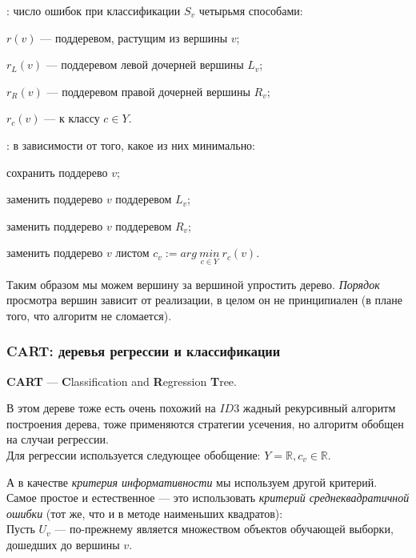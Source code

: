 \documentclass{article}
\begin{document}
\begin{itemize}
\qquad {}: \qquad число ошибок при классификации $S_v$ четырьмя способами:
		
			\qquad \qquad \qquad \qquad $r(v)$ --- поддеревом, растущим из вершины $v$;
			
			\qquad \qquad \qquad \qquad $r_L(v)$ --- поддеревом левой дочерней вершины $L_v$;
			
			\qquad \qquad \qquad \qquad $r_R(v)$ --- поддеревом правой дочерней вершины $R_v$;

			\qquad \qquad \qquad \qquad $r_c(v)$ --- к классу $c \in Y$.


\qquad {}: \qquad в зависимости от того, какое из них минимально:
		
			\qquad \qquad \qquad \qquad сохранить поддерево $v$;
			
			\qquad \qquad \qquad \qquad заменить поддерево $v$ поддеревом $L_v$;
			
			\qquad \qquad \qquad \qquad заменить поддерево $v$ поддеревом $R_v$;

			\qquad \qquad \qquad \qquad заменить поддерево $v$ листом
							$c_v := arg\ \underset{c \in Y}{min}\ r_c(v)$.
\end{itemize}

Таким образом мы можем вершину за вершиной упростить дерево. \textit{Порядок} просмотра вершин зависит от реализации, в целом он не принципиален (в плане того, что алгоритм не сломается).

\subsubsection{CART: деревья регрессии и классификации}

\textbf{CART} --- \textbf{C}lassification and \textbf{R}egression \textbf{T}ree.

В этом дереве тоже есть очень похожий на $ID3$ жадный рекурсивный алгоритм построения дерева, тоже применяются стратегии усечения, но алгоритм обобщен на случаи регрессии.
\\

Для регрессии используется следующее обобщение: $Y = \mathbb{R}, c_v \in \mathbb{R}$.

А в качестве \textit{критерия информативности} мы используем другой критерий. Самое простое и естественное --- это использовать \textit{критерий среднеквадратичной ошибки} (тот же, что и в методе наименьших квадратов):
\\

Пусть $U_v$ --- по-прежнему является множеством объектов обучающей выборки, дошедших до вершины $v$.
\end{document}
